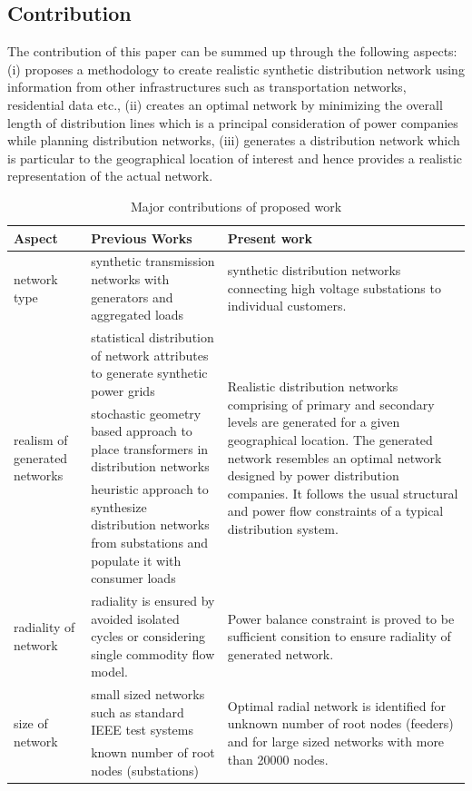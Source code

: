 \documentclass[sigconf]{acmart}
\begin{document}
\subsection{Contribution}\label{ssec:contri}
The contribution of this paper can be summed up through the following aspects: (i) proposes a methodology to create realistic synthetic distribution network using information from other infrastructures such as transportation networks, residential data etc., (ii) creates an optimal network by minimizing the overall length of distribution lines which is a principal consideration of power companies while planning distribution networks, (iii) generates a distribution network which is particular to the geographical location of interest and hence provides a realistic representation of the actual network.
\begin{table}[htb]
	\centering
	\caption{Major contributions of proposed work}
	\begin{tabular}{|p{5em}|p{20em}|p{20em}|}
		\toprule
		\textbf{Aspect} & \textbf{Previous Works} & \textbf{Present work} 
		\\\midrule
		network type & synthetic transmission networks with generators and aggregated loads & synthetic distribution networks connecting high voltage substations to individual customers.
		\\\midrule
		\multirow{3}{5em}{realism of generated networks} 
		& \multicolumn{1}{|p{20em}|}{statistical distribution of network attributes to generate synthetic power grids}
		& \multirow{3}{20em}{Realistic distribution networks comprising of primary and secondary levels are generated for a given geographical location. The generated network resembles an optimal network designed by power distribution companies. It follows the usual structural and power flow constraints of a typical distribution system.}
		\\\cmidrule{2-2}
		& \multicolumn{1}{|p{20em}|}{stochastic geometry based approach to place transformers in distribution networks}&\\\cmidrule{2-2}
		& \multicolumn{1}{|p{20em}|}{heuristic approach to synthesize distribution networks from substations and populate it with consumer loads}
		&
		\\\midrule
		radiality of network 
		& radiality is ensured by avoided isolated cycles or considering single commodity flow model. 
		& Power balance constraint is proved to be sufficient consition to ensure radiality of generated network. 
		\\\midrule
		\multirow{2}{5em}{size of network} 
		& \multicolumn{1}{|p{20em}|}{small sized networks such as standard IEEE test systems}
		& \multirow{2}{20em}{Optimal radial network is identified for unknown number of root nodes (feeders) and for large sized networks with more than 20000 nodes.} \\\cmidrule{2-2}
		& \multicolumn{1}{|p{20em}|}{known number of root nodes (substations)} 
		&  
		\\\bottomrule
	\end{tabular}
	\label{tab:contrib}
\end{table}
\end{document}
